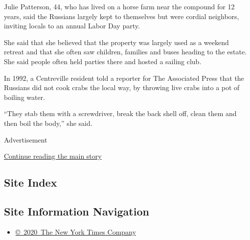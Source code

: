 Julie Patterson, 44, who has lived on a horse farm near the compound for
12 years, said the Russians largely kept to themselves but were cordial
neighbors, inviting locals to an annual Labor Day party.

She said that she believed that the property was largely used as a
weekend retreat and that she often saw children, families and buses
heading to the estate. She said people often held parties there and
hosted a sailing club.

In 1992, a Centreville resident told a reporter for The Associated Press
that the Russians did not cook crabs the local way, by throwing live
crabs into a pot of boiling water.

``They stab them with a screwdriver, break the back shell off, clean
them and then boil the body,'' she said.

Advertisement

\protect\hyperlink{after-bottom}{Continue reading the main story}

\hypertarget{site-index}{%
\subsection{Site Index}\label{site-index}}

\hypertarget{site-information-navigation}{%
\subsection{Site Information
Navigation}\label{site-information-navigation}}

\begin{itemize}
\tightlist
\item
  \href{https://help.nytimes3xbfgragh.onion/hc/en-us/articles/115014792127-Copyright-notice}{©~2020~The
  New York Times Company}
\end{itemize}

